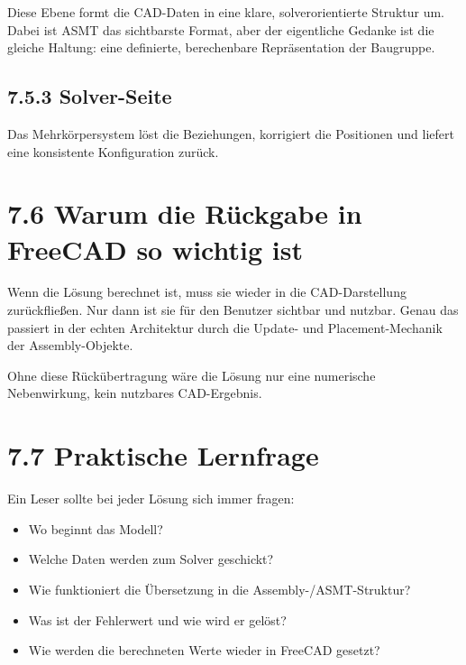 \documentclass[
  12pt
]{book}
\providecommand{\tightlist}{%
  \setlength{\itemsep}{0pt}\setlength{\parskip}{0pt}}
\begin{document}
Diese Ebene formt die CAD-Daten in eine klare, solverorientierte
Struktur um. Dabei ist ASMT das sichtbarste Format, aber der eigentliche
Gedanke ist die gleiche Haltung: eine definierte, berechenbare
Repräsentation der Baugruppe.

\hypertarget{solver-seite}{%
\subsection{\texorpdfstring{{7.5.3}
Solver-Seite}{7.5.3 Solver-Seite}}\label{solver-seite}}

Das Mehrkörpersystem löst die Beziehungen, korrigiert die Positionen und
liefert eine konsistente Konfiguration zurück.

\hypertarget{warum-die-ruxfcckgabe-in-freecad-so-wichtig-ist}{%
\section{\texorpdfstring{{7.6} Warum die Rückgabe in FreeCAD so wichtig
ist}{7.6 Warum die Rückgabe in FreeCAD so wichtig ist}}\label{warum-die-ruxfcckgabe-in-freecad-so-wichtig-ist}}

Wenn die Lösung berechnet ist, muss sie wieder in die CAD-Darstellung
zurückfließen. Nur dann ist sie für den Benutzer sichtbar und nutzbar.
Genau das passiert in der echten Architektur durch die Update- und
Placement-Mechanik der Assembly-Objekte.

Ohne diese Rückübertragung wäre die Lösung nur eine numerische
Nebenwirkung, kein nutzbares CAD-Ergebnis.

\hypertarget{praktische-lernfrage}{%
\section{\texorpdfstring{{7.7} Praktische
Lernfrage}{7.7 Praktische Lernfrage}}\label{praktische-lernfrage}}

Ein Leser sollte bei jeder Lösung sich immer fragen:

\begin{itemize}
\tightlist
\item
  Wo beginnt das Modell?
\item
  Welche Daten werden zum Solver geschickt?
\item
  Wie funktioniert die Übersetzung in die Assembly-/ASMT-Struktur?
\item
  Was ist der Fehlerwert und wie wird er gelöst?
\item
  Wie werden die berechneten Werte wieder in FreeCAD gesetzt?
\end{itemize}
\end{document}
